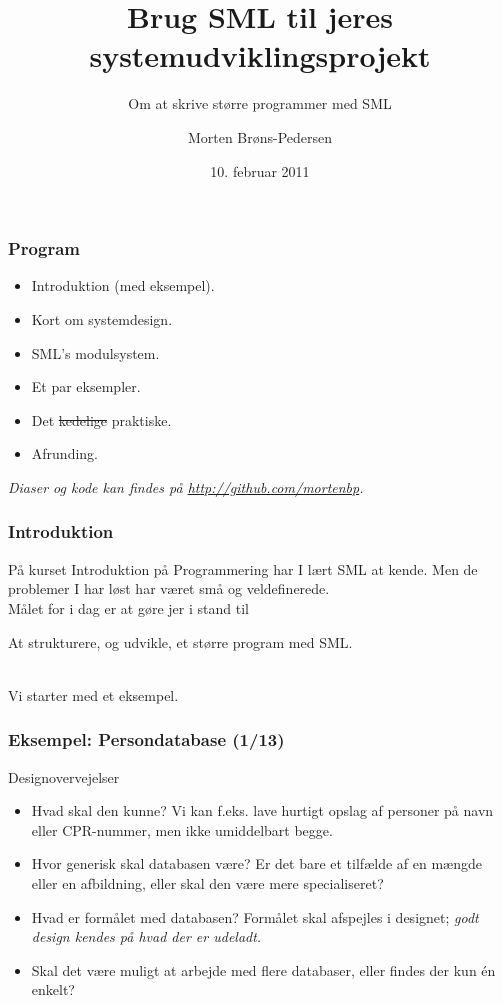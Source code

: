 \documentclass[slidestop,compress,mathserif, xcolor=table]{beamer}
\title[]{Brug SML til jeres systemudviklingsprojekt}
\subtitle{Om at skrive større programmer med SML}
\author[Morten Brøns-Pedersen]
       {Morten Brøns-Pedersen}
\institute[DIKU]{Datalogisk institut}
\date[]{10. februar 2011}
\begin{document}
\frame[plain]{\titlepage}

\begin{frame}
  \frametitle{Program}

  \begin{itemize}
  \item Introduktion (med eksempel).
  \item Kort om systemdesign.
  \item SML's modulsystem.
  \item Et par eksempler.
  \item Det \sout{kedelige} praktiske.
  \item Afrunding.
  \end{itemize}\vfill

  \textit{Diaser og kode kan findes på \url{http://github.com/mortenbp}.}
\end{frame}

\begin{frame}
  \frametitle{Introduktion}

  På kurset Introduktion på Programmering har I lært SML at kende. Men de
  problemer I har løst har været små og veldefinerede.\\[1em]

  Målet for i dag er at gøre jer i stand til
  \begin{block}{}
    \center At strukturere, og udvikle, et større program med SML.
  \end{block}\ \\

  Vi starter med et eksempel.
\end{frame}

\begin{frame}
  \frametitle{Eksempel: Persondatabase \quad (1/13)}

  Designovervejelser
  \begin{itemize}
  \item Hvad skal den kunne? Vi kan f.eks. lave hurtigt opslag af personer på
    navn eller CPR-nummer, men ikke umiddelbart begge.
  \item Hvor generisk skal databasen være? Er det bare et tilfælde af en mængde
    eller en afbildning, eller skal den være mere specialiseret?
  \item Hvad er formålet med databasen? Formålet skal afspejles i designet; \textit{godt
      design kendes på hvad der er udeladt.}
  \item Skal det være muligt at arbejde med flere databaser, eller findes der
    kun én enkelt?
  \end{itemize}
\end{frame}
\end{document}
